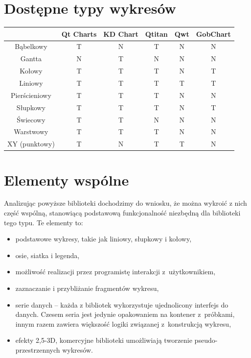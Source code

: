 \documentclass[11pt,twoside,a4paper,final]{llncs}
\begin{document}
\section{Dostępne typy wykresów}
\begin{tabular}{|c|c|c|c|c|c|}
\hline
&  Qt Charts & KD Chart & Qtitan & Qwt & GobChart\\
\hline
Bąbelkowy & T & N & T & N & N\\
\hline
Gantta & N & T & N & N & N\\
\hline
Kołowy & T & T & T & N & T\\
\hline
Liniowy & T & T & T & T & T\\
\hline
Pierścieniowy & T & T & T & N & N\\
\hline
Słupkowy & T & T & T & N & T\\
\hline
Świecowy & T & T & N & N & N\\
\hline
Warstwowy & T & T & T & N & N\\
\hline
XY (punktowy) & T & N & T & T & N\\
\hline

\end{tabular}


\section{Elementy wspólne}
Analizując powyższe biblioteki dochodzimy do wniosku, że można wykroić z nich część wspólną, stanowiącą podstawową funkcjonalność niezbędną dla biblioteki tego typu. Te elementy to:
\begin{itemize}
\item{podstawowe wykresy, takie jak liniowy, słupkowy i kołowy,}
\item{osie, siatka i legenda,}
\item{możliwość realizacji przez programistę interakcji z~użytkownikiem,}
\item{zaznaczanie i przybliżanie fragmentów wykresu,}
\item{serie danych -- każda z bibliotek wykorzystuje ujednolicony interfejs do danych. Czesem seria jest jedynie opakowaniem na kontener z~próbkami, innym razem zawiera większość logiki związanej z~konstrukcją wykresu,}
\item{efekty 2,5-3D, komercyjne biblioteki umożliwiają tworzenie pseudo-przestrzennych wykresów.}
\end{itemize}
\end{document}
